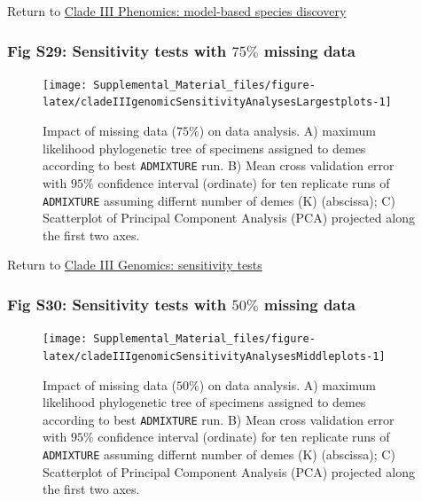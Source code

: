 \documentclass[
  11pt,
]{article}
\begin{document}
Return to \protect\hyperlink{model-based-species-discovery-4}{Clade III Phenomics: model-based species discovery}
\pagebreak

\hypertarget{fig-s29-sensitivity-tests-with-75-missing-data}{%
\subsubsection{\texorpdfstring{Fig S29: Sensitivity tests with \(75\%\) missing data}{Fig S29: Sensitivity tests with 75\textbackslash\% missing data}}\label{fig-s29-sensitivity-tests-with-75-missing-data}}

\begin{figure}
\texttt{[image: Supplemental\_Material\_files/figure-latex/cladeIIIgenomicSensitivityAnalysesLargestplots-1]} \caption{Impact of missing data ($75\%$) on data analysis. A) maximum likelihood phylogenetic tree of specimens assigned to demes according to best \texttt{ADMIXTURE} run. B) Mean cross validation error with $95\%$ confidence interval (ordinate) for ten replicate runs of \texttt{ADMIXTURE} assuming differnt number of demes (K) (abscissa); C) Scatterplot of Principal Component Analysis (PCA) projected along the first two axes.}\label{fig:cladeIIIgenomicSensitivityAnalysesLargestplots}
\end{figure}

Return to \protect\hyperlink{sensitivity-tests-2}{Clade III Genomics: sensitivity tests}
\pagebreak

\hypertarget{fig-s30-sensitivity-tests-with-50-missing-data}{%
\subsubsection{\texorpdfstring{Fig S30: Sensitivity tests with \(50\%\) missing data}{Fig S30: Sensitivity tests with 50\textbackslash\% missing data}}\label{fig-s30-sensitivity-tests-with-50-missing-data}}

\begin{figure}
\texttt{[image: Supplemental\_Material\_files/figure-latex/cladeIIIgenomicSensitivityAnalysesMiddleplots-1]} \caption{Impact of missing data ($50\%$) on data analysis. A) maximum likelihood phylogenetic tree of specimens assigned to demes according to best \texttt{ADMIXTURE} run. B) Mean cross validation error with $95\%$ confidence interval (ordinate) for ten replicate runs of \texttt{ADMIXTURE} assuming differnt number of demes (K) (abscissa); C) Scatterplot of Principal Component Analysis (PCA) projected along the first two axes.}\label{fig:cladeIIIgenomicSensitivityAnalysesMiddleplots}
\end{figure}
\end{document}
